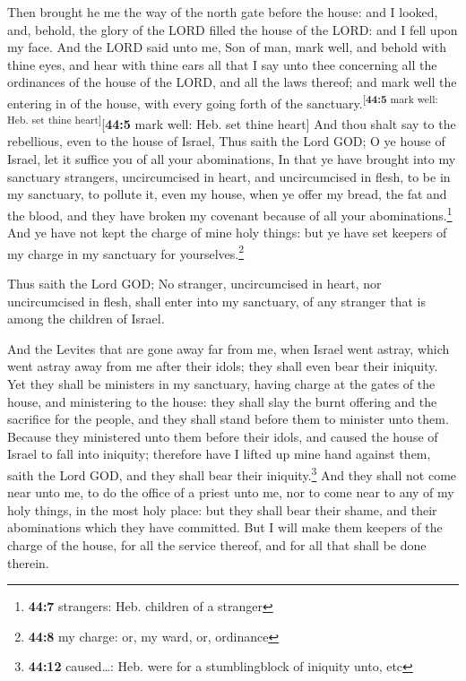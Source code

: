  Then brought he me the way of the north gate before the
house: and I looked, and, behold, the glory of the LORD filled the house
of the LORD: and I fell upon my face.  And the LORD said
unto me, Son of man, mark well, and behold with thine eyes, and hear
with thine ears all that I say unto thee concerning all the ordinances
of the house of the LORD, and all the laws thereof; and mark well the
entering in of the house, with every going forth of the
sanctuary.\textsuperscript{{[}\textbf{44:5} mark well: Heb. set thine
heart{]}}{[}\textbf{44:5} mark well: Heb. set thine heart{]}
 And thou shalt say to the rebellious, even to the house
of Israel, Thus saith the Lord GOD; O ye house of Israel, let it suffice
you of all your abominations,  In that ye have brought
into my sanctuary strangers, uncircumcised in heart, and uncircumcised
in flesh, to be in my sanctuary, to pollute it, even my house, when ye
offer my bread, the fat and the blood, and they have broken my covenant
because of all your abominations.\footnote{\textbf{44:7} strangers: Heb.
  children of a stranger}  And ye have not kept the charge
of mine holy things: but ye have set keepers of my charge in my
sanctuary for yourselves.\footnote{\textbf{44:8} my charge: or, my ward,
  or, ordinance}

 Thus saith the Lord GOD; No stranger, uncircumcised in
heart, nor uncircumcised in flesh, shall enter into my sanctuary, of any
stranger that is among the children of Israel.

 And the Levites that are gone away far from me, when
Israel went astray, which went astray away from me after their idols;
they shall even bear their iniquity.  Yet they shall be
ministers in my sanctuary, having charge at the gates of the house, and
ministering to the house: they shall slay the burnt offering and the
sacrifice for the people, and they shall stand before them to minister
unto them.  Because they ministered unto them before
their idols, and caused the house of Israel to fall into iniquity;
therefore have I lifted up mine hand against them, saith the Lord GOD,
and they shall bear their iniquity.\footnote{\textbf{44:12}
  caused\ldots: Heb. were for a stumblingblock of iniquity unto, etc}
 And they shall not come near unto me, to do the office
of a priest unto me, nor to come near to any of my holy things, in the
most holy place: but they shall bear their shame, and their abominations
which they have committed.  But I will make them keepers
of the charge of the house, for all the service thereof, and for all
that shall be done therein.

